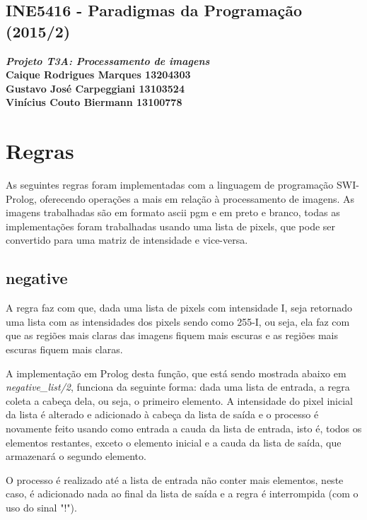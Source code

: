 \documentclass{article}
\begin{document}
\lstset{language=Prolog} %

\begin{center} 
    \section*{INE5416 - Paradigmas da Programação (2015/2)}
    \textbf{\textit{Projeto T3A: Processamento de imagens} \\
    Caique Rodrigues Marques 13204303 \\ 
    Gustavo José Carpeggiani 13103524 \\
    Vinícius Couto Biermann  13100778}
\end{center}

\section*{Regras}
    As seguintes regras foram implementadas com a linguagem de programação SWI-Prolog, oferecendo operações a mais em relação à processamento de imagens. As imagens trabalhadas são em formato ascii pgm e em preto e branco, todas as implementações foram trabalhadas usando uma lista de pixels, que pode ser convertido para uma matriz de intensidade e vice-versa.
    
    \subsection*{negative}
        A regra faz com que, dada uma lista de pixels com intensidade I, seja retornado uma lista com as intensidades dos pixels sendo como 255-I, ou seja, ela faz com que as regiões mais claras das imagens fiquem mais escuras e as regiões mais escuras fiquem mais claras.

        A implementação em Prolog desta função, que está sendo mostrada abaixo em \textit{negative\_list/2}, funciona da seguinte forma: dada uma lista de entrada, a regra coleta a cabeça dela, ou seja, o primeiro elemento. A intensidade do pixel inicial da lista é alterado e adicionado à cabeça da lista de saída e o processo é novamente feito usando como entrada a cauda da lista de entrada, isto é, todos os elementos restantes, exceto o elemento inicial e a cauda da lista de saída, que armazenará o segundo elemento.

        O processo é realizado até a lista de entrada não conter mais elementos, neste caso, é adicionado nada ao final da lista de saída e a regra é interrompida (com o uso do sinal "!").
\end{document}
